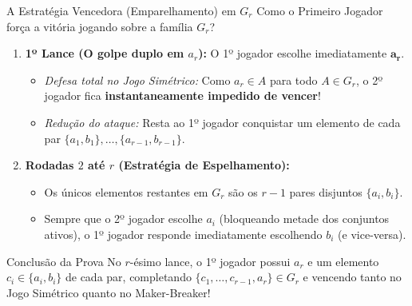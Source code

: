 \documentclass[11pt, aspectratio=169]{beamer}
\begin{document}
\begin{frame}{A Estratégia Vencedora (Emparelhamento) em $G_r$}
    Como o Primeiro Jogador força a vitória jogando sobre a família $G_r$?

    \begin{enumerate}
        \item \textbf{1º Lance (O golpe duplo em $a_r$):} O 1º jogador escolhe imediatamente $\mathbf{a_r}$.
        \begin{itemize}
            \item \textit{Defesa total no Jogo Simétrico:} Como $a_r \in A$ para todo $A \in G_r$, o 2º jogador fica \textbf{instantaneamente impedido de vencer}!
            \item \textit{Redução do ataque:} Resta ao 1º jogador conquistar um elemento de cada par $\{a_1, b_1\}, \dots, \{a_{r-1}, b_{r-1}\}$.
        \end{itemize}
        \vspace{0.2cm}
        \item \textbf{Rodadas $2$ até $r$ (Estratégia de Espelhamento):}
        \begin{itemize}
            \item Os únicos elementos restantes em $G_r$ são os $r-1$ pares disjuntos $\{a_i, b_i\}$.
            \item Sempre que o 2º jogador escolhe $a_i$ (bloqueando metade dos conjuntos ativos), o 1º jogador responde imediatamente escolhendo $b_i$ (e vice-versa).
        \end{itemize}
    \end{enumerate}

    \begin{alertblock}{Conclusão da Prova}
        No $r$-ésimo lance, o 1º jogador possui $a_r$ e um elemento $c_i \in \{a_i, b_i\}$ de cada par, completando $\{c_1, \dots, c_{r-1}, a_r\} \in G_r$ e vencendo tanto no Jogo Simétrico quanto no Maker-Breaker!
    \end{alertblock}
\end{frame}
\end{document}
